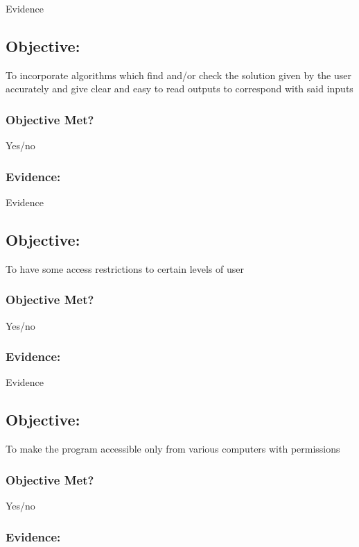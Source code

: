 Evidence

\subsection{Objective: }

To incorporate algorithms which find and/or check the solution given by the user accurately and give clear and easy to read outputs to correspond with said inputs

\subsubsection{Objective Met?}

Yes/no 

\subsubsection{Evidence: }

Evidence

\subsection{Objective: }

To have some access restrictions to certain levels of user

\subsubsection{Objective Met?}

Yes/no 

\subsubsection{Evidence: }

Evidence

\subsection{Objective: }

To make the program accessible only from various computers with permissions

\subsubsection{Objective Met?}

Yes/no 

\subsubsection{Evidence: }

